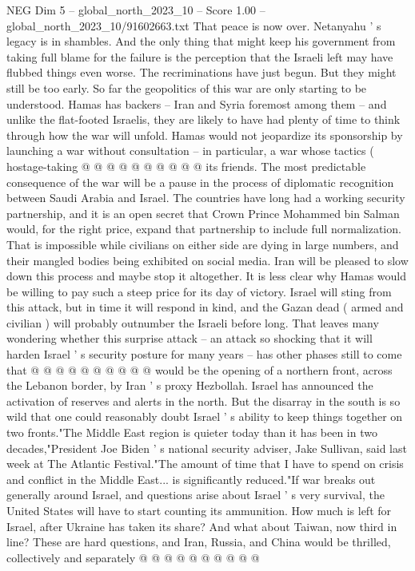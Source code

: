 \begin{textsample}{NEG Dim 5 – global\_north\_2023\_10 – Score 1.00 – global\_north\_2023\_10/91602663.txt}
That peace is now over.
Netanyahu ' s legacy is in shambles.
And the only thing that might keep his government from taking full blame for the failure is the perception that the Israeli left may have flubbed things even worse.
The recriminations have just begun.
But they might still be too early.
So far the geopolitics of this war are only starting to be understood.
Hamas has backers -- Iran and Syria foremost among them -- and unlike the flat-footed Israelis, they are likely to have had plenty of time to think through how the war will unfold.
Hamas would not jeopardize its sponsorship by launching a war without consultation -- in particular, a war whose tactics ( hostage-taking @ @ @ @ @ @ @ @ @ @ its friends.
The most predictable consequence of the war will be a pause in the process of diplomatic recognition between Saudi Arabia and Israel.
The countries have long had a working security partnership, and it is an open secret that Crown Prince Mohammed bin Salman would, for the right price, expand that partnership to include full normalization.
That is impossible while civilians on either side are dying in large numbers, and their mangled bodies being exhibited on social media.
Iran will be pleased to slow down this process and maybe stop it altogether.
It is less clear why Hamas would be willing to pay such a steep price for its day of victory.
Israel will sting from this attack, but in time it will respond in kind, and the Gazan dead ( armed and civilian ) will probably outnumber the Israeli before long.
That leaves many wondering whether this surprise attack -- an attack so shocking that it will harden Israel ' s security posture for many years -- has other phases still to come that @ @ @ @ @ @ @ @ @ @ would be the opening of a northern front, across the Lebanon border, by Iran ' s proxy Hezbollah.
Israel has announced the activation of reserves and alerts in the north.
But the disarray in the south is so wild that one could reasonably doubt Israel ' s ability to keep things together on two fronts."The Middle East region is quieter today than it has been in two decades,"President Joe Biden ' s national security adviser, Jake Sullivan, said last week at The Atlantic Festival."The amount of time that I have to spend on crisis and conflict in the Middle East... is significantly reduced."If war breaks out generally around Israel, and questions arise about Israel ' s very survival, the United States will have to start counting its ammunition.
How much is left for Israel, after Ukraine has taken its share?
And what about Taiwan, now third in line?
These are hard questions, and Iran, Russia, and China would be thrilled, collectively and separately @ @ @ @ @ @ @ @ @ @

\end{textsample}
